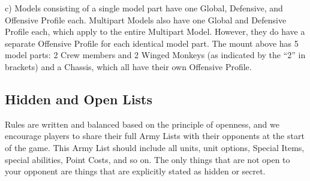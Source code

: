 c) Models consisting of a single model part have one Global, Defensive, and Offensive Profile each. Multipart Models also have one Global and Defensive Profile each, which apply to the entire Multipart Model. However, they do have a separate Offensive Profile for each identical model part. The mount above has 5 model parts: 2 Crew members and 2 Winged Monkeys (as indicated by the \enquote{2} in brackets) and a Chassis, which all have their own Offensive Profile.

\RBemc

\newpage

\raggedcolumns
\begin{multicols}{2}

\section{Hidden and Open Lists}
\label{hidden_and_open_lists}

Rules are written and balanced based on the principle of openness, and we encourage players to share their full Army Lists with their opponents at the start of the game. This Army List should include all units, unit options, Special Items, special abilities, Point Costs, and so on. The only things that are not open to your opponent are things that are explicitly stated as hidden or secret.

\columnbreak
\strut
\end{multicols}

